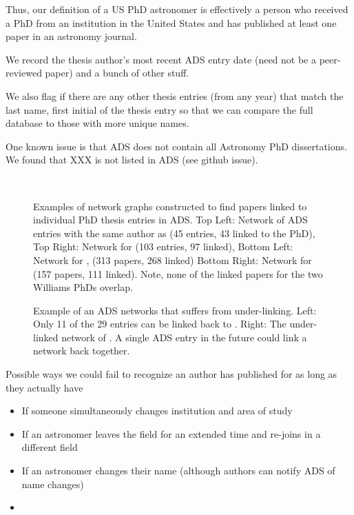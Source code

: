 \documentclass{emulateapj}
\begin{document}
Thus, our definition of a US PhD astronomer is effectively a person who received a PhD from an institution in the United States and has published at least one paper in an astronomy journal.

We record the thesis author's most recent ADS entry date (need not be a peer-reviewed paper)  and a bunch of other stuff.

We also flag if there are any other thesis entries (from any year) that match the last name, first initial of the thesis entry so that we can compare the full database to those with more unique names.

One known issue is that ADS does not contain all Astronomy PhD dissertations. We found that XXX is not listed in ADS (see github issue).


\begin{figure*}
  \\
        \caption{Examples of network graphs constructed to find papers linked to individual PhD thesis entries in ADS.   Top Left: Network of ADS entries with the same author as \citet{Yoachim07} (45 entries, 43 linked to the PhD), Top Right: Network for \citet{Bellm2011} (103 entries, 97 linked), Bottom Left: Network for \citet{Williams02}, (313 papers, 268 linked) Bottom Right: Network for \citet{Williams11} (157 papers, 111 linked).  Note, none of the linked papers for the two Williams PhDs overlap. \label{fig:example_networks}}
\end{figure*}

\begin{figure*}
  \caption{Example of an ADS networks that suffers from under-linking.  Left: Only 11 of the 29 entries can be linked back to \citet{Wetzel10}.  Right: The under-linked network of \citet{Capelo12}.  A single ADS entry in the future could link a network back together.}
\end{figure*}



Possible ways we could fail to recognize an author has published for as long as they actually have
\begin{itemize}
\item{If someone simultaneously changes institution and area of study}
  \item{If an astronomer leaves the field for an extended time and re-joins in a different field}
\item{If an astronomer changes their name (although authors can notify ADS of name changes)}
  \item{}
\end{itemize}
\end{document}
